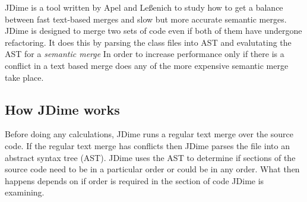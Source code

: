 JDime is a tool written by  Apel and Le{\ss}enich \cite{Apel2012} \cite{Apel2011} \cite{LeBenich2012} to study how to get a balance between fast text-based merges and slow but more accurate semantic merges.  JDime is designed to merge two sets of code even if both of them have undergone refactoring. It does this by parsing the class files into AST and evalutating the AST for a \emph{semantic merge} In order to increase performance only if there is a conflict in a text based merge does any of the more expensive semantic merge take place. 

\subsection{How JDime works}

Before doing any calculations, JDime runs a regular text merge over the source code.  
If the regular text merge has conflicts then JDime parses the file into an abstract syntax tree (AST).  JDime uses the AST to determine if sections of the source code need to be in a particular order or could be in any order.
What then happens depends on if order is required in the section of code JDime is examining.



